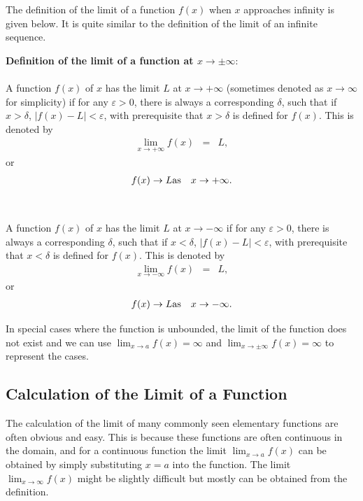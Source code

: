 The definition of the limit of a function $f(x)$ when $x$ approaches infinity is given below. It is quite similar to the definition of the limit of an infinite sequence.
\begin{VF}
\textbf{Definition of the limit of a function at $x\rightarrow \pm \infty$}:
\\
\\
\noindent A function $f(x)$ of $x$ has the limit $L$ at $x \rightarrow +\infty$ (sometimes denoted as $x \rightarrow \infty$ for simplicity) if for any $\varepsilon > 0$, there is always a corresponding $\delta$, such that if $x > \delta$, $|f(x)-L| < \varepsilon$, with prerequisite that $x > \delta$ is defined for $f(x)$. This is denoted by
\begin{eqnarray}
   \lim_{x\rightarrow +\infty} f(x) &=& L, \nonumber
\end{eqnarray}
or
\begin{eqnarray}
  f(x) \rightarrow L & \textup{as} & x \rightarrow +\infty. \nonumber
\end{eqnarray}
\\
\\
\noindent A function $f(x)$ of $x$ has the limit $L$ at $x \rightarrow -\infty$ if for any $\varepsilon > 0$, there is always a corresponding $\delta$, such that if $x < \delta$, $|f(x)-L| < \varepsilon$, with prerequisite that $x < \delta$ is defined for $f(x)$. This is denoted by
\begin{eqnarray}
   \lim_{x\rightarrow -\infty} f(x) &=& L, \nonumber
\end{eqnarray}
or
\begin{eqnarray}
  f(x) \rightarrow L & \textup{as} & x \rightarrow -\infty. \nonumber
\end{eqnarray}
\end{VF}

In special cases where the function is unbounded, the limit of the function does not exist and we can use $\lim_{x\rightarrow a}f(x) =  \infty$ and $\lim_{x\rightarrow \pm \infty}f(x) = \infty$ to represent the cases.

\subsection{Calculation of the Limit of a Function} \label{ch1subsec:calculationlimitfunction}

The calculation of the limit of many commonly seen elementary functions are often obvious and easy. This is because these functions are often continuous in the domain, and for a continuous function the limit $\lim_{x\rightarrow a}f(x)$ can be obtained by simply substituting $x=a$ into the function. The limit $\lim_{x\rightarrow \infty}f(x)$ might be slightly difficult but mostly can be obtained from the definition.

